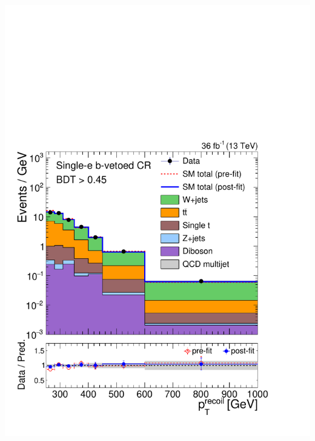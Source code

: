 \documentclass[aspectratio=169,xcolor=dvipsnames,,table,compress]{beamer}
\begin{document}
\begin{frame}[t]
\begin{columns}[T]
\begin{column}{0.125\textwidth}
      \includegraphics[width=\textwidth]{../figures/monotop/postfit/stackedPostfit_singleelectronw_monotop.pdf}\\ 

\end{column}
\end{columns}
\end{frame}
\end{document}
